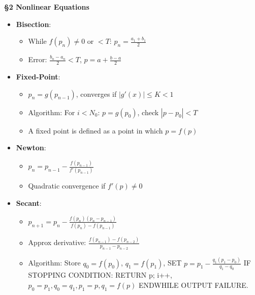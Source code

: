 \documentclass{article}
\begin{document}
\begin{tcolorbox}[colframe=black,colback=white,boxrule=0.3pt,arc=1pt,
left=0pt,right=0pt,top=0pt,bottom=0pt]
\begin{minipage}[t]{0.49\textwidth}
\textbf{\S2 Nonlinear Equations}
\begin{itemize}
\item \textbf{Bisection}:
\begin{itemize}
\item While $f(p_n)\neq0$ or $<T$: $p_n=\frac{a_1+b_1}{2}$
\item Error: $\frac{b_n-a_n}{2}<T$, $p=a+\frac{b-a}{2}$
\end{itemize}
\item \textbf{Fixed-Point}:
\begin{itemize}
\item $p_n=g(p_{n-1})$, converges if $|g'(x)|\leq K<1$
\item Algorithm: For $i<N_0$: $p=g(p_0)$, check $|p-p_0|<T$
\item A fixed point is defined as a point in which $p = f(p)$
\end{itemize}
\item \textbf{Newton}:
\begin{itemize}
\item $p_n=p_{n-1}-\frac{f(p_{n-1})}{f'(p_{n-1})}$
\item Quadratic convergence if $f'(p)\neq0$
\end{itemize}
\item \textbf{Secant}:
\begin{itemize}
\item $p_{n+1}=p_n-\frac{f(p_n)(p_n-p_{n-1})}{f(p_n)-f(p_{n-1})}$
\item Approx derivative: $\frac{f(p_{n-1})-f(p_{n-2})}{p_{n-1}-p_{n-2}}$
\item Algorithm: Store $q_0=f(p_0)$, $q_1=f(p_1)$, SET $p=p_1-\frac{q_1(p_1-p_0)}{q_1-q_0}$ IF STOPPING CONDITION: RETURN p; i++, $p_0=p_1, q_0=q_1, p_1=p, q_1=f(p)$ ENDWHILE OUTPUT FAILURE.
\end{itemize}
\end{itemize}


\end{minipage}
\end{tcolorbox}
\end{document}
